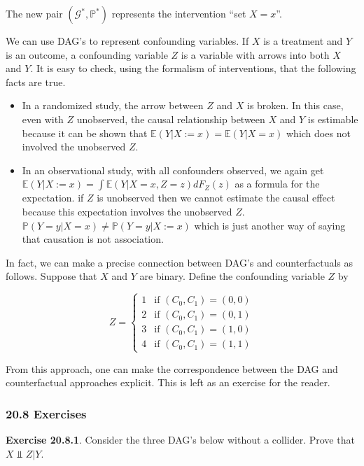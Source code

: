 The new pair \((\mathcal{G}^*, \mathbb{P}^*)\) represents the
intervention ``set \(X = x\)''.

We can use DAG's to represent confounding variables. If \(X\) is a
treatment and \(Y\) is an outcome, a confounding variable \(Z\) is a
variable with arrows into both \(X\) and \(Y\). It is easy to check,
using the formalism of interventions, that the following facts are true.

\begin{itemize}[tightlist]
\item
  In a randomized study, the arrow between \(Z\) and \(X\) is broken. In
  this case, even with \(Z\) unobserved, the causal relationship between
  \(X\) and \(Y\) is estimable because it can be shown that
  \(\mathbb{E}(Y | X := x) = \mathbb{E}(Y | X = x)\) which does not
  involved the unobserved \(Z\).\\
\item
  In an observational study, with all confounders observed, we again get
  \(\mathbb{E}(Y | X := x) = \int \mathbb{E}(Y | X = x, Z = z) d F_Z(z)\)
  as a formula for the expectation. if \(Z\) is unobserved then we
  cannot estimate the causal effect because this expectation involves
  the unobserved \(Z\).
  \(\mathbb{P}(Y = y | X = x) \neq \mathbb{P}(Y = y | X := x)\) which is
  just another way of saying that causation is not association.
\end{itemize}

In fact, we can make a precise connection between DAG's and
counterfactuals as follows. Suppose that \(X\) and \(Y\) are binary.
Define the confounding variable \(Z\) by

\[ Z = \begin{cases}
1 & \text{if } (C_0, C_1) = (0, 0) \\
2 & \text{if } (C_0, C_1) = (0, 1) \\
3 & \text{if } (C_0, C_1) = (1, 0) \\
4 & \text{if } (C_0, C_1) = (1, 1)
\end{cases}\]

From this approach, one can make the correspondence between the DAG and
counterfactual approaches explicit. This is left as an exercise for the
reader.

\subsubsection{20.8 Exercises}\label{exercises}

\textbf{Exercise 20.8.1}. Consider the three DAG's below without a
collider. Prove that \(X \text{ ⫫ } Z | Y\).


